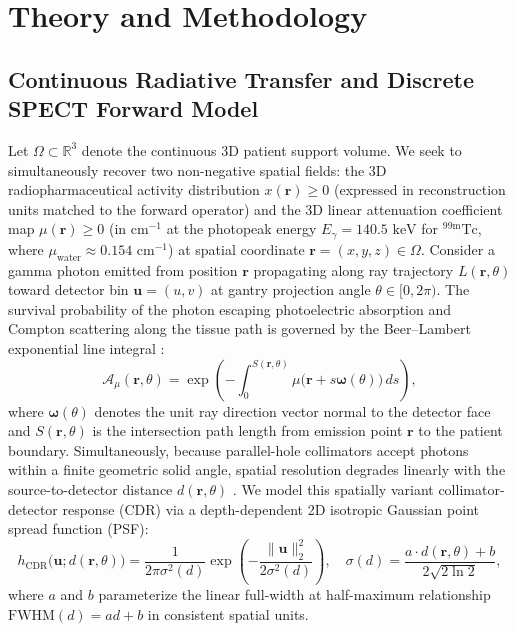 \documentclass[11pt, a4paper]{article}
\begin{document}
\section{Theory and Methodology}

\subsection{Continuous Radiative Transfer and Discrete SPECT Forward Model}
Let $\Omega \subset \mathbb{R}^3$ denote the continuous 3D patient support volume. We seek to simultaneously recover two non-negative spatial fields: the 3D radiopharmaceutical activity distribution $x(\mathbf{r}) \ge 0$ (expressed in reconstruction units matched to the forward operator) and the 3D linear attenuation coefficient map $\mu(\mathbf{r}) \ge 0$ (in $\text{cm}^{-1}$ at the photopeak energy $E_\gamma = 140.5\text{ keV}$ for $^{99\text{m}}\text{Tc}$, where $\mu_{\text{water}} \approx 0.154\text{ cm}^{-1}$) at spatial coordinate $\mathbf{r} = (x, y, z) \in \Omega$. Consider a gamma photon emitted from position $\mathbf{r}$ propagating along ray trajectory $L(\mathbf{r}, \theta)$ toward detector bin $\mathbf{u} = (u, v)$ at gantry projection angle $\theta \in [0, 2\pi)$. The survival probability of the photon escaping photoelectric absorption and Compton scattering along the tissue path is governed by the Beer--Lambert exponential line integral \cite{ref4, ref5}:
\begin{equation}
\mathcal{A}_\mu(\mathbf{r}, \theta) = \exp\left( -\int_{0}^{S(\mathbf{r}, \theta)} \mu\big(\mathbf{r} + s \boldsymbol{\omega}(\theta)\big) \, ds \right),
\end{equation}
where $\boldsymbol{\omega}(\theta)$ denotes the unit ray direction vector normal to the detector face and $S(\mathbf{r}, \theta)$ is the intersection path length from emission point $\mathbf{r}$ to the patient boundary. Simultaneously, because parallel-hole collimators accept photons within a finite geometric solid angle, spatial resolution degrades linearly with the source-to-detector distance $d(\mathbf{r}, \theta)$ \cite{ref5}. We model this spatially variant collimator-detector response (CDR) via a depth-dependent 2D isotropic Gaussian point spread function (PSF):
\begin{equation}
h_{\text{CDR}}\big(\mathbf{u}; d(\mathbf{r}, \theta)\big) = \frac{1}{2\pi \sigma^2(d)} \exp\left( -\frac{\|\mathbf{u}\|_2^2}{2\sigma^2(d)} \right), \quad \sigma(d) = \frac{a \cdot d(\mathbf{r}, \theta) + b}{2\sqrt{2\ln 2}},
\end{equation}
where $a$ and $b$ parameterize the linear full-width at half-maximum relationship $\mathrm{FWHM}(d) = a d + b$ in consistent spatial units.
\end{document}
